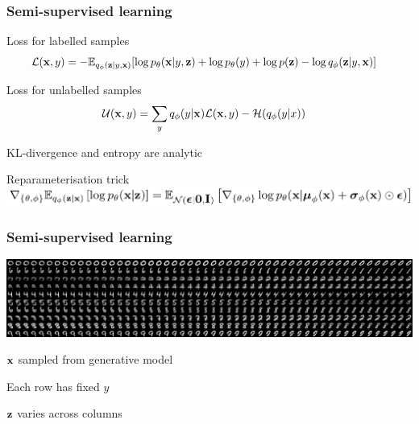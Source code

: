 \documentclass[10pt]{beamer}
\begin{document}
\begin{frame}
  \frametitle{Semi-supervised learning}

  Loss for labelled samples
  \begin{align*}
    \mathcal{L}(\boldsymbol{\mathbf{x}},y) &=
      - \mathbb{E}_{q_\phi(\boldsymbol{\mathbf{z}}|y, \boldsymbol{\mathbf{x}})}[
        \log p_\theta(\boldsymbol{\mathbf{x}}|y, \boldsymbol{\mathbf{z}})
        + \log p_\theta(y)
        + \log p(\boldsymbol{\mathbf{z}})
        - \log q_\phi(\boldsymbol{\mathbf{z}}|y, \boldsymbol{\mathbf{x}})]
  \end{align*}

  Loss for unlabelled samples
  \begin{align*}
    \mathcal{U}(\boldsymbol{\mathbf{x}},y) &=
      \sum_y q_\phi(y|\boldsymbol{\mathbf{x}}) \mathcal{L}(\boldsymbol{\mathbf{x}}, y)
      - \mathcal{H}(q_\phi(y|x))
  \end{align*}

  KL-divergence and entropy are analytic

  \begin{block}{Reparameterisation trick}
    \includegraphics[width=\textwidth]{img/reparameterisation-trick}
  \end{block}
\end{frame}



\begin{frame}
  \frametitle{Semi-supervised learning}
  \includegraphics[width=\textwidth]{img/semi-M2-072}

  $\boldsymbol{\mathbf{x}}$ sampled from generative model

  Each row has fixed $y$

  $\boldsymbol{\mathbf{z}}$ varies across columns
\end{frame}
\end{document}
